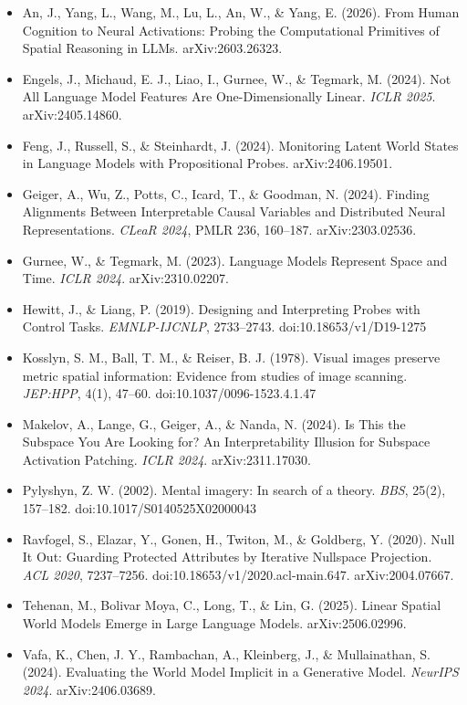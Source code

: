 \documentclass[
  11pt,
]{article}
\providecommand{\tightlist}{%
  \setlength{\itemsep}{0pt}\setlength{\parskip}{0pt}}
\begin{document}
\begin{itemize}
\tightlist
\item
  An, J., Yang, L., Wang, M., Lu, L., An, W., \& Yang, E. (2026). From
  Human Cognition to Neural Activations: Probing the Computational
  Primitives of Spatial Reasoning in LLMs. arXiv:2603.26323.
\item
  Engels, J., Michaud, E. J., Liao, I., Gurnee, W., \& Tegmark, M.
  (2024). Not All Language Model Features Are One-Dimensionally Linear.
  \emph{ICLR 2025}. arXiv:2405.14860.
\item
  Feng, J., Russell, S., \& Steinhardt, J. (2024). Monitoring Latent
  World States in Language Models with Propositional Probes.
  arXiv:2406.19501.
\item
  Geiger, A., Wu, Z., Potts, C., Icard, T., \& Goodman, N. (2024).
  Finding Alignments Between Interpretable Causal Variables and
  Distributed Neural Representations. \emph{CLeaR 2024}, PMLR 236,
  160--187. arXiv:2303.02536.
\item
  Gurnee, W., \& Tegmark, M. (2023). Language Models Represent Space and
  Time. \emph{ICLR 2024}. arXiv:2310.02207.
\item
  Hewitt, J., \& Liang, P. (2019). Designing and Interpreting Probes
  with Control Tasks. \emph{EMNLP-IJCNLP}, 2733--2743.
  doi:10.18653/v1/D19-1275
\item
  Kosslyn, S. M., Ball, T. M., \& Reiser, B. J. (1978). Visual images
  preserve metric spatial information: Evidence from studies of image
  scanning. \emph{JEP:HPP}, 4(1), 47--60. doi:10.1037/0096-1523.4.1.47
\item
  Makelov, A., Lange, G., Geiger, A., \& Nanda, N. (2024). Is This the
  Subspace You Are Looking for? An Interpretability Illusion for
  Subspace Activation Patching. \emph{ICLR 2024}. arXiv:2311.17030.
\item
  Pylyshyn, Z. W. (2002). Mental imagery: In search of a theory.
  \emph{BBS}, 25(2), 157--182. doi:10.1017/S0140525X02000043
\item
  Ravfogel, S., Elazar, Y., Gonen, H., Twiton, M., \& Goldberg, Y.
  (2020). Null It Out: Guarding Protected Attributes by Iterative
  Nullspace Projection. \emph{ACL 2020}, 7237--7256.
  doi:10.18653/v1/2020.acl-main.647. arXiv:2004.07667.
\item
  Tehenan, M., Bolivar Moya, C., Long, T., \& Lin, G. (2025). Linear
  Spatial World Models Emerge in Large Language Models.
  arXiv:2506.02996.
\item
  Vafa, K., Chen, J. Y., Rambachan, A., Kleinberg, J., \& Mullainathan,
  S. (2024). Evaluating the World Model Implicit in a Generative Model.
  \emph{NeurIPS 2024}. arXiv:2406.03689.
\end{itemize}
\end{document}
